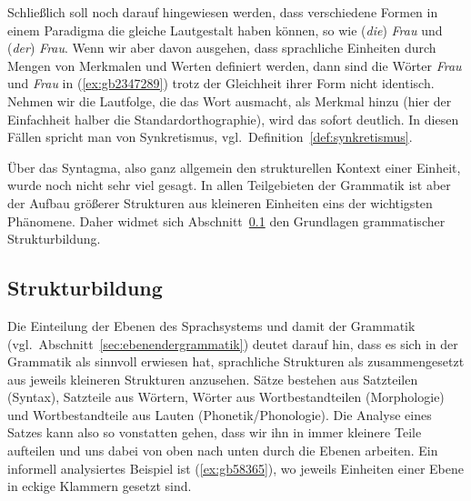 Schließlich soll noch darauf hingewiesen werden, dass verschiedene Formen in einem Paradigma die gleiche Lautgestalt haben können, so wie (\textit{die}) \textit{Frau} und (\textit{der}) \textit{Frau}.
Wenn wir aber davon ausgehen, dass sprachliche Einheiten durch Mengen von Merkmalen und Werten definiert werden, dann sind die Wörter \textit{Frau} und \textit{Frau} in (\ref{ex:gb2347289}) trotz der Gleichheit ihrer Form nicht identisch.
Nehmen wir die Lautfolge, die das Wort ausmacht, als Merkmal hinzu (hier der Einfachheit halber die Standardorthographie), wird das sofort deutlich.
In diesen Fällen spricht man von Synkretismus, vgl.\ Definition~\ref{def:synkretismus}.

\begin{exe}
  \ex\label{ex:gb2347289}
  \begin{xlist}
  \end{xlist}
\end{exe}


Über das Syntagma, also ganz allgemein den strukturellen Kontext einer Einheit, wurde noch nicht sehr viel gesagt.
In allen Teilgebieten der Grammatik ist aber der Aufbau größerer Strukturen aus kleineren Einheiten eins der wichtigsten Phänomene.
Daher widmet sich Abschnitt~\ref{sec:strukturbildung} den Grundlagen grammatischer Strukturbildung.

\subsection{Strukturbildung}

\label{sec:strukturbildung}

Die Einteilung der Ebenen des Sprachsystems und damit der Grammatik (vgl.\ Abschnitt~\ref{sec:ebenendergrammatik}) deutet darauf hin, dass es sich in der Grammatik als sinnvoll erwiesen hat, sprachliche Strukturen als zusammengesetzt aus jeweils kleineren Strukturen anzusehen.
Sätze bestehen aus Satzteilen (Syntax), Satzteile aus Wörtern, Wörter aus Wortbestandteilen (Morphologie) und Wortbestandteile aus Lauten (Phonetik\slash Phonologie).
Die Analyse eines Satzes kann also so vonstatten gehen, dass wir ihn in immer kleinere Teile aufteilen und uns dabei von oben nach unten durch die Ebenen arbeiten.
Ein informell analysiertes Beispiel ist (\ref{ex:gb58365}), wo jeweils Einheiten einer Ebene in eckige Klammern gesetzt sind.

